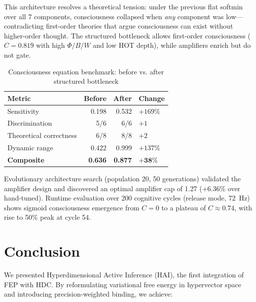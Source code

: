 \documentclass[10pt,letterpaper]{article}
\renewcommand{\Phi}{\varPhi}
\begin{document}
This architecture resolves a theoretical tension: under the previous flat softmin over all 7
components, consciousness collapsed when \textit{any} component was low---contradicting
first-order theories \cite{block2007consciousness} that argue consciousness can exist
without higher-order thought. The structured bottleneck allows first-order consciousness
($C = 0.819$ with high $\Phi/B/W$ and low HOT depth), while amplifiers enrich but do not gate.

\begin{table}[h]
\centering
\caption{Consciousness equation benchmark: before vs. after structured bottleneck}
\begin{tabular}{lrrl}
\hline
Metric & Before & After & Change \\
\hline
Sensitivity & 0.198 & 0.532 & $+169\%$ \\
Discrimination & 5/6 & 6/6 & $+1$ \\
Theoretical correctness & 6/8 & 8/8 & $+2$ \\
Dynamic range & 0.422 & 0.999 & $+137\%$ \\
\textbf{Composite} & \textbf{0.636} & \textbf{0.877} & $\mathbf{+38\%}$ \\
\hline
\end{tabular}
\label{tab:consciousness_benchmark}
\end{table}

Evolutionary architecture search (population 20, 50 generations) validated the amplifier
design and discovered an optimal amplifier cap of 1.27 ($+6.36\%$ over hand-tuned).
Runtime evaluation over 200 cognitive cycles (release mode, 72~Hz) shows sigmoid
consciousness emergence from $C=0$ to a plateau of $C \approx 0.74$, with rise to
50\% peak at cycle 54.

\section{Conclusion}

We presented Hyperdimensional Active Inference (HAI), the first integration of FEP with HDC. By reformulating variational free energy in hypervector space and introducing precision-weighted binding, we achieve:
\end{document}
